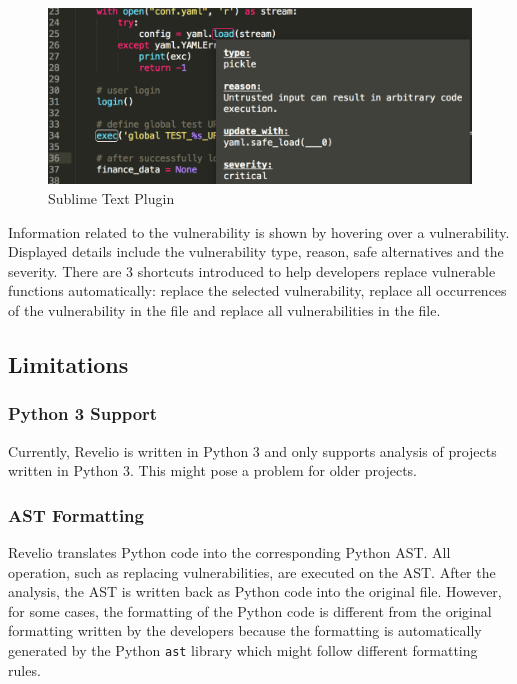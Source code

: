 \begin{figure}[h]
\centering
\includegraphics[width=\linewidth]{"figures/sublime"}
\caption{Sublime Text Plugin}
\label{fig:sublime}
\end{figure}

Information related to the vulnerability is shown by hovering over a vulnerability. Displayed details include the vulnerability type, reason, safe alternatives and the severity.
There are 3 shortcuts introduced to help developers replace vulnerable functions automatically: replace the selected vulnerability, replace all occurrences of the vulnerability in the file
and replace all vulnerabilities in the file.

\subsection{Limitations}


\subsubsection{Python 3 Support}

Currently, Revelio is written in Python 3 and only supports analysis of projects written in Python 3. This might pose a problem for older projects. 

\subsubsection{AST Formatting}

Revelio translates Python code into the corresponding Python AST. All operation, such as replacing vulnerabilities, are executed on the AST. After the analysis, the AST is written back as Python code into the original file. However, for some cases, the formatting of the Python code is different from the original formatting written by the developers because the formatting is automatically generated by the Python \texttt{ast} library which might follow different formatting rules.  

